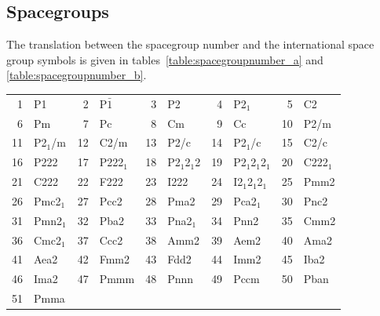 \documentclass[final,12pt]{article}
\begin{document}
{{{{{{\subsection{Spacegroups}
The translation between the spacegroup number and the international
space group symbols is given in tables~\ref{table:spacegroupnumber_a}
and \ref{table:spacegroupnumber_b}.
\begin{table}[h!]
\begin{center}
\begin{tabular}{||r|l||r|l||r|l||r|l||r|l||}
\hline
1      & P1                 & 
2      & P$\bar{1}$         & 
3      & P2                 & 
4      & P2$_1$             & 
5      & C2                 \\
6      & Pm                 & 
7      & Pc                 & 
8      & Cm                 & 
9      & Cc                 & 
10     & P2/m               \\
11     & P2$_1$/m           & 
12     & C2/m               & 
13     & P2/c               & 
14     & P2$_1$/c           & 
15     & C2/c               \\
16     & P222               & 
17     & P222$_1$           & 
18     & P2$_1$2$_1$2       & 
19     & P2$_1$2$_1$2$_1$   & 
20     & C222$_1$           \\
21     & C222               & 
22     & F222               & 
23     & I222               & 
24     & I2$_1$2$_1$2$_1$   & 
25     & Pmm2               \\
26     & Pmc2$_1$           & 
27     & Pcc2               & 
28     & Pma2               & 
29     & Pca2$_1$           & 
30     & Pnc2               \\
31     & Pmn2$_1$           & 
32     & Pba2               & 
33     & Pna2$_1$           & 
34     & Pnn2               & 
35     & Cmm2               \\
36     & Cmc2$_1$           & 
37     & Ccc2               & 
38     & Amm2               & 
39     & Aem2               & 
40     & Ama2               \\
41     & Aea2               & 
42     & Fmm2               & 
43     & Fdd2               & 
44     & Imm2               & 
45     & Iba2               \\
46     & Ima2               & 
47     & Pmmm               & 
48     & Pnnn               & 
49     & Pccm               & 
50     & Pban               \\
51     & Pmma               & 

\end{tabular}
\end{center}
\end{table}}}}}}}
\end{document}
